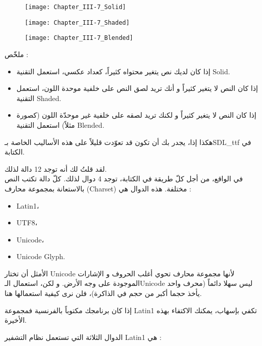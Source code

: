 \begin{figure}[H]
	\centering
	\texttt{[image: Chapter\_III-7\_Solid]}
\end{figure}
\begin{figure}[H]
	\centering
	\texttt{[image: Chapter\_III-7\_Shaded]}
\end{figure}
\begin{figure}[H]
	\centering
	\texttt{[image: Chapter\_III-7\_Blended]}
\end{figure}

ملخّص :

\begin{itemize}
	\item إذا كان لديك نص يتغير محتواه كثيراً، كعداد عكسي، استعمل التقنية 
	\textenglish{Solid}.
	\item إذا كان النص لا يتغير كثيراً و أنك تريد لصق النص على خلفية موحدة اللون، استعمل التقنية 
	\textenglish{Shaded}.
	\item إذا كان النص لا يتغير كثيراً و لكنك تريد لصقه على خلفية غير موحدّة اللون (كصورة مثلاً) استعمل التقنية 
	\textenglish{Blended}.
\end{itemize}

هكذا إذا، يجدر بك أن تكون قد تعوّدت قليلاً على هذه الأساليب الخاصة بـ\textenglish{SDL\_ttf}
في الكتابة.

لقد قلتُ لك أنه توجد 12 دالة لذلك.\\
في الواقع، من أجل كلّ طريقة في الكتابة، توجد 4 دوال لذلك. كلّ دالة تكتب النص بالاستعانة بمجموعة محارف 
(\textenglish{Charset})
مختلفة. هذه الدوال هي :

\begin{itemize}
	\item \textenglish{Latin1}،
	\item \textenglish{UTF8}،
	\item \textenglish{Unicode}،
	\item \textenglish{Unicode Glyph}.
\end{itemize}

الأمثل أن تختار
\textenglish{Unicode}
لأنها مجموعة محارف تحوي أغلب الحروف و الإشارات الموجودة على وجه الأرض. و لكن، استعمال الـ\textenglish{Unicode}
ليس سهلا دائماً (محرف واحد يأخذ حجما أكبر من حجم
في الذاكرة)، فلن نرى كيفية استعمالها هنا.

إذا كان برنامجك مكتوباً بالفرنسية فمجموعة
\textenglish{Latin1}
تكفي بإسهاب، يمكنك الاكتفاء بهذه الأخيرة.

الدوال الثلاثة التي تستعمل نظام التشفير
\textenglish{Latin1}
هي :

